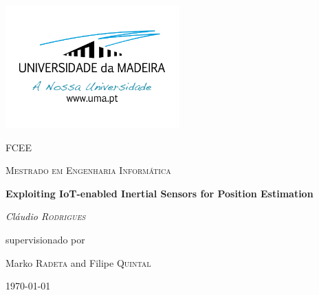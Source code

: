 \begin{titlepage}
\centering
\addtolength{\hoffset}{0cm}
    \centering
	\includegraphics[width=0.50\textwidth]{figures/logoUMa.png}\par\vspace{1cm}
	{\scshape\LARGE FCEE \par}
	\vspace{1cm}
	{\scshape\Large Mestrado em Engenharia Informática \par}
	\vspace{1.5cm}
	{\huge\bfseries Exploiting IoT-enabled Inertial Sensors for Position Estimation \par}
	\vspace{2cm}
	{\Large\itshape Cláudio \textsc{Rodrigues}\par}
	\vfill
	supervisionado por \par
	Marko \textsc{Radeta} and Filipe \textsc{Quintal}

	\vfill

	{\large {}\today\par}
\end{titlepage}